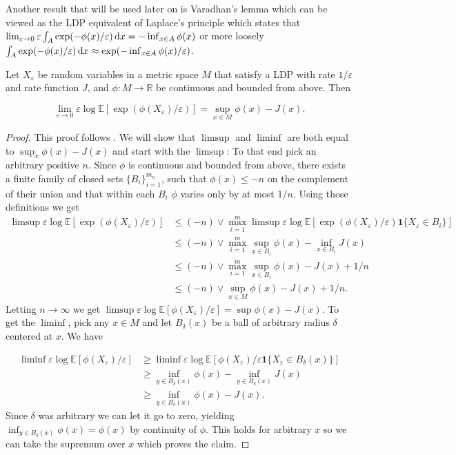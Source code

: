 Another result that will be used later on is Varadhan's lemma which can be viewed as the LDP equivalent of Laplace's principle which states that $\lim_{\varepsilon\rightarrow 0} \varepsilon \int_A \exp(-\phi(x)/\varepsilon)\mathop{}\!\mathrm{d} x = -\inf_{x\in A} \phi(x)$ or more loosely \newline$\int_A \exp(-\phi(x)/\varepsilon)\mathop{}\!\mathrm{d} x\approx\exp(-\inf_{x\in A}\phi(x)/\varepsilon)$.
\begin{lemma}[Varadhan]
	Let $X_\varepsilon$ be random variables in a metric space $M$ that satisfy a LDP with rate $1/\varepsilon$ and rate function $J$, and $\phi:M\rightarrow\mathbb R$ be continuous and bounded from above. Then 
	
	$$\lim_{\varepsilon\rightarrow 0}\varepsilon\log\mathbb E[\exp(\phi(X_\varepsilon)/\varepsilon)]=\sup_{x\in M}\phi(x)-J(x).$$
\end{lemma}
\begin{proof}
	This proof follows \cite{scLDP}. We will show that $\limsup$ and $\liminf$ are both equal to 	$\sup_x \phi(x)-J(x)$ and start with the $\limsup$:
	To that end pick an arbitrary positive $n$. Since $\phi$ is continuous and bounded from above, there exists a finite family of closed sets $\{B_i\}_{i=1}^{m_n}$, such that $\phi(x)\leq -n$ on the complement of their union and that within each $B_i$ $\phi$ varies only by at most $1/n$.
	Using those definitions we get
	\begin{align*}
		\limsup\varepsilon\log\mathbb E[\exp(\phi(X_\varepsilon)/\varepsilon)]
		&\leq(-n)\lor\max_{i=1}^m \limsup\varepsilon\log\mathbb E[\exp(\phi(X_\varepsilon)/\varepsilon)\mathbf 1\{X_\varepsilon\in B_i\}]\\
		&\leq(-n)\lor\max_{i=1}^m\sup_{x\in B_i}\phi(x)-\inf_{x\in B_i} J(x)\\
		&\leq(-n)\lor\max_{i=1}^m\sup_{x\in B_i}\phi(x)-J(x)+1/n\\
		&\leq(-n)\lor\sup_{x\in M}\phi(x)-J(x)+1/n.
	\end{align*}
	Letting $n\rightarrow\infty$ we get $\limsup\varepsilon\log\mathbb E[\phi(X_\varepsilon)/\varepsilon]=\sup \phi(x)-J(x)$.
	To get the $\liminf$, pick any $x\in M$ and let $B_{\delta}(x)$ be a ball of arbitrary radius $\delta$ centered at $x$.
	We have
	
	\begin{align*}
		\liminf\varepsilon\log\mathbb E[\phi(X_\varepsilon)/\varepsilon]
		&\geq\liminf\varepsilon\log\mathbb E[\phi(X_\varepsilon)/\varepsilon\mathbf 1\{X_\varepsilon\in B_\delta(x)\}]\\
		&\geq\inf_{y\in B_\delta(x)}\phi(x)-\inf_{y\in B_\delta(x)}J(x)\\
		&\geq\inf_{y\in B_\delta(x)}\phi(x)-J(x).
	\end{align*}
	Since $\delta$ was arbitrary we can let it go to zero, yielding $\inf_{y\in B_\delta(x)}\phi(x)=\phi(x)$ by continuity of $\phi$. This holds for arbitrary $x$ so we can take the supremum over $x$ which proves the claim.
\end{proof}


